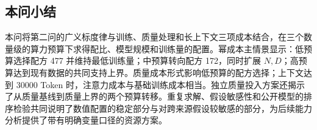 \subsection{本问小结}

本问将第二问的广义标度律与训练、质量处理和长上下文三项成本结合，在三个数量级的算力预算下求得配比、模型规模和训练量的配置。幂成本主情景显示：低预算选择配方 477 并维持最低训练量；中预算转向配方 172，同时扩展 $N,D$；高预算达到现有数据的共同支持上界。质量成本形式影响低预算的配方选择；上下文达到 30000 Token 时，注意力成本与基础训练成本相当。独立质量投入方案还揭示了从质量基线到质量上界的两个预算转移。重复求解、假设敏感性和公开模型的排序检验共同说明了数值配置的稳定部分与对跨来源假设较敏感的部分，为后续能力分析提供了带有明确变量口径的资源方案。
